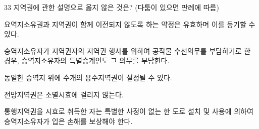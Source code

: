 \begin{question}{33}
지역권에 관한 설명으로 옳지 않은 것은? (다툼이 있으면 판례에 따름)
\begin{choices}
  \item 요역지소유권과 지역권이 함께 이전되지 않도록 하는 약정은 유효하며 이를 등기할 수 있다.
  \item 승역지소유자가 지역권자의 지역권 행사를 위하여 공작물 수선의무를 부담하기로 한 경우, 승역지소유자의 특별승계인도 그 의무를 부담한다.
  \item 동일한 승역지 위에 수개의 용수지역권이 설정될 수 있다.
  \item 전망지역권은 소멸시효에 걸리지 않는다.
  \item 통행지역권을 시효로 취득한 자는 특별한 사정이 없는 한 도로 설치 및 사용에 의하여 승역지소유자가 입은 손해를 보상해야 한다.
\end{choices}
\end{question}
